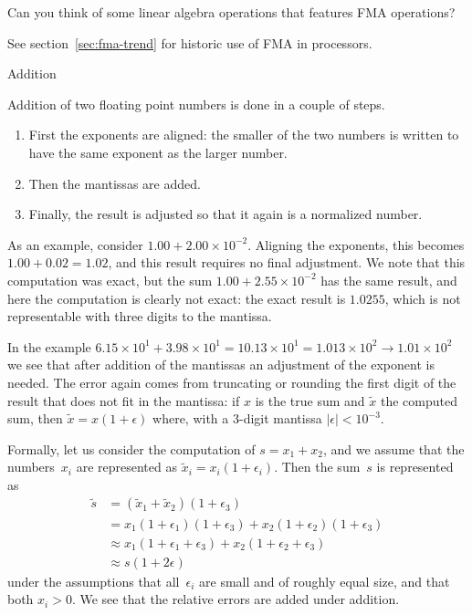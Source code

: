 \begin{exercise}
  Can you think of some linear algebra operations that features
  \ac{FMA} operations?
\end{exercise}

See section~\ref{sec:fma-trend} for historic use of \ac{FMA} in processors.

 {Addition}

Addition of two floating point numbers is done in a couple of steps.
\begin{enumerate}
\item
  First the exponents are aligned: the smaller of the two numbers is
  written to have the same exponent as the larger number.
\item Then the
  mantissas are added.
\item Finally, the result is adjusted
  so that it again is a normalized number.
\end{enumerate}
As an example, consider $1.00+2.00\times 10^{-2}$. Aligning the
exponents, this becomes $1.00+0.02=1.02$, and this result requires no
final adjustment. We note that this computation was exact, but
the sum $1.00+2.55\times 10^{-2}$ has the same result, and here the
computation is clearly not exact: the exact result is $1.0255$, which
is not representable with three digits to the mantissa.

In the example $6.15\times 10^1+3.98\times 10^1=10.13\times 10^1=1.013\times
10^2\rightarrow 1.01\times 10^2$ we see that after addition of the mantissas an
adjustment of the exponent is needed. The error again comes from
truncating or rounding the first digit of the result that does not fit
in the mantissa: if $x$ is the true sum and $\tilde x$ the computed
sum, then $\tilde x=x(1+\epsilon)$ where, with a 3-digit mantissa
$|\epsilon|<10^{-3}$.

Formally, let us consider the computation of
$s=x_1+x_2$, and we assume that the numbers~$x_i$ are represented
as $\tilde x_i=x_i(1+\epsilon_i)$.
Then the sum~$s$ is represented as
\begin{equation}
\begin{array}{rl}
\tilde s&=(\tilde x_1+\tilde x_2)(1+\epsilon_3)\\
&=x_1(1+\epsilon_1)(1+\epsilon_3)+x_2(1+\epsilon_2)(1+\epsilon_3)\\
&\approx x_1(1+\epsilon_1+\epsilon_3)+x_2(1+\epsilon_2+\epsilon_3)\\
&\approx s(1+2\epsilon)
\end{array}
\end{equation}
under the assumptions that all~$\epsilon_i$ are small and of roughly
equal size, and that both $x_i>0$.
We see that the relative errors are added under addition.

